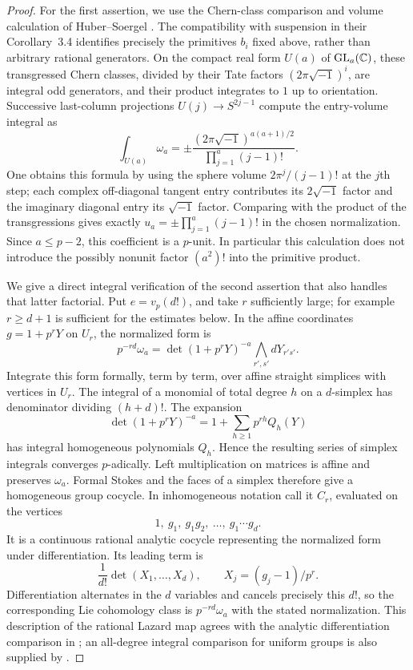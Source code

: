 \begin{proof}
For the first assertion, we use the Chern-class comparison and
volume calculation of Huber--Soergel
\cite[Propositions~1.3, 3.3, and 4.1]{HuberSoergel}.
The compatibility with suspension in their Corollary~3.4 identifies
precisely the primitives $b_i$ fixed above, rather than arbitrary
rational generators.  On the compact real form $U(a)$ of
$\operatorname{GL}_a(\mathbb C)$, these transgressed Chern classes, divided by their
Tate factors $(2\pi\sqrt{-1})^i$, are integral odd generators, and
their product integrates to $1$ up to orientation.
Successive last-column projections
$U(j)\to S^{2j-1}$ compute the entry-volume integral as
\[
 \int_{U(a)}\omega_a
   =\pm\frac{(2\pi\sqrt{-1})^{a(a+1)/2}}
                 {\prod_{j=1}^a(j-1)!}.
\]
One obtains this formula by using the sphere volume
$2\pi^j/(j-1)!$ at the $j$th step; each complex off-diagonal tangent
entry contributes its $2\sqrt{-1}$ factor and the imaginary diagonal
entry its $\sqrt{-1}$ factor.  Comparing with the product of the
transgressions gives exactly $u_a=\pm\prod_{j=1}^a(j-1)!$ in the
chosen normalization.  Since $a\leq p-2$, this coefficient is a
$p$-unit.  In particular this calculation does not introduce
the possibly nonunit factor $(a^2)!$ into the primitive product.

We give a direct integral verification of the second assertion that
also handles that latter factorial.  Put
$e=v_p(d!)$, and take $r$ sufficiently large; for example $r\geq d+1$
is sufficient for the estimates below.  In the affine coordinates
$g=1+p^rY$ on $U_r$, the normalized form is
\[
 p^{-rd}\omega_a
       =\det(1+p^rY)^{-a}\bigwedge_{r',s'}dY_{r's'}.
\]
Integrate this form formally, term by term, over affine straight
simplices with vertices in $U_r$.  The integral of a monomial of
total degree $h$ on a $d$-simplex has denominator dividing
$(h+d)!$.  The expansion
\[
 \det(1+p^rY)^{-a}
      =1+\sum_{h\geq1}p^{rh}Q_h(Y)
\]
has integral homogeneous polynomials $Q_h$.  Hence the resulting
series of simplex integrals converges $p$-adically.  Left
multiplication on matrices is affine and preserves $\omega_a$.
Formal Stokes and the faces of a simplex therefore give a homogeneous
group cocycle.  In inhomogeneous notation call it $C_r$, evaluated
on the vertices
\[
 1,\ g_1,\ g_1g_2,\ \ldots,\ g_1\cdots g_d.
\]
It is a continuous rational analytic cocycle representing the
normalized form under differentiation.  Its leading term is
\[
 \frac{1}{d!}\det(X_1,\ldots,X_d),
 \qquad X_j=(g_j-1)/p^r.
\]
Differentiation alternates in the $d$ variables and cancels precisely
this $d!$, so the corresponding Lie cohomology class is
$p^{-rd}\omega_a$ with the stated normalization.  This description
of the rational Lazard map agrees with the analytic differentiation
comparison in \cite[Section~4]{HuberKings}; an all-degree integral
comparison for uniform groups is also supplied by
\cite[Theorem~3.3.3, Proposition~4.2.4, and Remark~4.2.5]
{HuberKingsNaumann}.


\end{proof}
